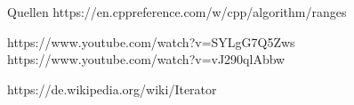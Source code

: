 \begin{frame}{Quellen}
    https://en.cppreference.com/w/cpp/algorithm/ranges


    https://www.youtube.com/watch?v=SYLgG7Q5Zws
    https://www.youtube.com/watch?v=vJ290qlAbbw

    https://de.wikipedia.org/wiki/Iterator
\end{frame}